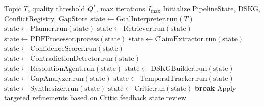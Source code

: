 \begin{algorithm}[ht]
\caption{Autonomy Loop Controller}\label{alg:loop}
\begin{algorithmic}[1]
\REQUIRE Topic $T$, quality threshold $Q^*$, max iterations $I_{\max}$
\STATE Initialize PipelineState, DSKG, ConflictRegistry, GapStore
\STATE $\text{state} \leftarrow \text{GoalInterpreter.run}(T)$
\STATE $\text{state} \leftarrow \text{Planner.run}(\text{state})$
    \STATE $\text{state} \leftarrow \text{Retriever.run}(\text{state})$
    \STATE $\text{state} \leftarrow \text{PDFProcessor.process}(\text{state})$
    \STATE $\text{state} \leftarrow \text{ClaimExtractor.run}(\text{state})$
    \STATE $\text{state} \leftarrow \text{ConfidenceScorer.run}(\text{state})$
    \STATE $\text{state} \leftarrow \text{ContradictionDetector.run}(\text{state})$
    \STATE $\text{state} \leftarrow \text{ResolutionAgent.run}(\text{state})$
    \STATE $\text{state} \leftarrow \text{DSKGBuilder.run}(\text{state})$
    \STATE $\text{state} \leftarrow \text{GapAnalyzer.run}(\text{state})$
    \STATE $\text{state} \leftarrow \text{TemporalTracker.run}(\text{state})$
    \STATE $\text{state} \leftarrow \text{Synthesizer.run}(\text{state})$
    \STATE $\text{state} \leftarrow \text{Critic.run}(\text{state})$
        \STATE \textbf{break}
    \ELSE
        \STATE Apply targeted refinements based on Critic feedback
    \ENDIF
\ENDFOR
\RETURN state.review
\end{algorithmic}
\end{algorithm}

